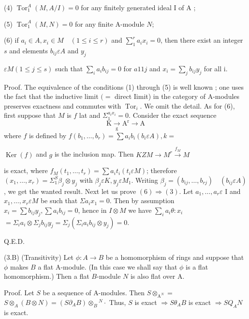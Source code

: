 (4) $\operatorname{Tor}_{1}^{A}(M, A / I)=0$ for any finitely generated ideal I of A ;

(5) $\operatorname{Tor}_{1}^{A}(M, N)=0$ for any finite A-module $N$;

(6) if $a_{i} \in A, x_{i} \in M \quad(1 \leqslant i \leqslant r)$ and $\sum_{1}^{r} a_{i} x_{i}=0$, then there exist an integer $s$ and elements $b_{i j} \varepsilon A$ and $y_{j}$

$\varepsilon M(1 \leqslant j \leqslant s)$ such that $\sum_{i} a_{i} b_{i j}=0$ for $a 11 j$ and $x_{i}=\sum_{j} b_{i j} y_{j}$ for all i.

Proof. The equivalence of the conditions (1) through (5) is well known ; one uses the fact that the inductive limit $(=$ direct Iimit) in the category of A-modules preserves exactness and commutes with $\operatorname{Tor}_{i}$. We omit the detail. As for (6), first suppose that $M$ is $f$ lat and $\Sigma_{1}^{a_{i} x_{i}}=0$. Consider the exact sequence
$$
\mathrm{K} \underset{\mathrm{g}}{\rightarrow} \mathrm{A}^{\mathrm{r}} \rightarrow \mathrm{A}
$$
where $f$ is defined by $f\left(b_{1}, \ldots, b_{r}\right)=\sum a_{i} b_{i}\left(b_{i} \varepsilon A\right), k=$

$\operatorname{Ker}(f)$ and $g$ is the inclusion map. Then $K Z M \rightarrow M^{r} \stackrel{f_{M}}{\rightarrow} M$

is exact, where $f_{M}\left(t_{1}, \ldots, t_{r}\right)=\sum a_{i} t_{i}\left(t_{i} \varepsilon M\right)$; therefore $\left(x_{1}, \ldots, x_{r}\right)=\Sigma_{1}^{S} \beta_{j} \otimes y_{j}$ with $\beta_{j} \varepsilon K, y_{j} \varepsilon M_{1}$. Writing $\beta_{j}=\left(b_{i j}, \ldots, b_{r j}\right) \quad\left(b_{i j} \varepsilon A\right)$, we get the wanted result. Next let us prove $(6) \Rightarrow(3)$. Let $a_{1}, \ldots, a_{r} \varepsilon$ I and $x_{1}, \ldots, x_{r} \varepsilon M$ be such that $\Sigma a_{i} x_{1}=0$. Then by assumption $x_{i}=\sum b_{i j} y_{j}, \sum a_{i} b_{i j}=0$, hence in $I \otimes M$ we have $\sum_{i} a_{i} \theta: x_{i}$ $=\Sigma_{i} a_{i} \otimes \Sigma_{j} b_{i j} y_{j}=\Sigma_{j}\left(\Sigma_{i} a_{i} b_{i j} \otimes y_{j}\right)=0$.

Q.E.D.

(3.B) (Transitivity) Let $\phi: A \rightarrow B$ be a homomorphism of rings and suppose that $\phi$ makes $B$ a flat A-module. (In this case we shall say that $\phi$ is a flat homomorphism.) Then a flat $B$-module $N$ is also flat over A.

Proof. Let $S$ be a sequence of A-modules. Then $S \otimes_{\mathrm{A}^{N}}=$ $S \otimes_{A}(B \otimes N)=\left(S \partial_{A} B\right) \otimes_{B}{ }^{N} \cdot$ Thus, $S$ is exact $\Rightarrow S \theta_{A} B$ is exact $\Rightarrow S Q_{A} N$ is exact.

